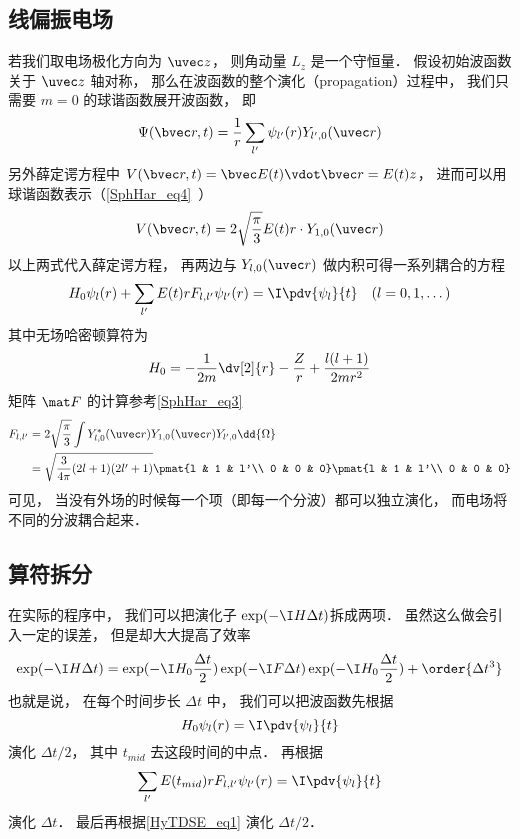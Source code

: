 \subsection{线偏振电场}
若我们取电场极化方向为 $\uvec z$， 则角动量 $L_z$ 是一个守恒量． 假设初始波函数关于 $\uvec z$ 轴对称， 那么在波函数的整个演化（propagation）过程中， 我们只需要 $m=0$ 的球谐函数展开波函数， 即
\begin{equation}
\Psi(\bvec r, t) = \frac{1}{r}\sum_{l'} \psi_{l'}(r) Y_{l', 0}(\uvec r)
\end{equation}
另外薛定谔方程中 $V(\bvec r, t) = \bvec E(t) \vdot \bvec r = E(t) z$， 进而可以用球谐函数表示（\autoref{SphHar_eq4}~）
\begin{equation}
V(\bvec r, t) = 2 \sqrt{\frac{\pi}{3}} E(t) r \cdot Y_{1,0}(\uvec r)
\end{equation}
以上两式代入薛定谔方程， 再两边与 $Y_{l,0}(\uvec r)$ 做内积可得一系列耦合的方程
\begin{equation}\label{HyTDSE_eq4}
H_0 \psi_{l}(r) + \sum_{l'} E(t)rF_{l, l'} \psi_{l'}(r) = \I \pdv{\psi_{l}}{t} \quad (l=0,1,\dots)
\end{equation}
其中无场哈密顿算符为
\begin{equation}
H_0 = -\frac{1}{2m} \dv[2]{r} -\frac{Z}{r} + \frac{l(l+1)}{2mr^2}
\end{equation}
矩阵 $\mat F$ 的计算参考\autoref{SphHar_eq3}~
\begin{equation}
\begin{aligned}
F_{l,l'} &= 2 \sqrt{\frac{\pi}{3}} \int Y_{l,0}^*(\uvec r) Y_{1,0}(\uvec r) Y_{l',0} \dd{\Omega}\\
&= \sqrt{\frac{3}{4\pi} (2l+1)(2l'+1)} \pmat{l & 1 & l'\\ 0 & 0 & 0}\pmat{l & 1 & l'\\ 0 & 0 & 0}
\end{aligned}
\end{equation}
可见， 当没有外场的时候每一个项（即每一个分波）都可以独立演化， 而电场将不同的分波耦合起来．

\subsection{算符拆分}
在实际的程序中， 我们可以把演化子 $\exp(-\I H \Delta t)$拆成两项． 虽然这么做会引入一定的误差， 但是却大大提高了效率
\begin{equation}\label{HyTDSE_eq2}
\exp(-\I H \Delta t) = \exp(-\I H_0 \frac{\Delta t}{2}) \exp(-\I F \Delta t)\exp(-\I H_0 \frac{\Delta t}{2}) + \order{\Delta t^3}
\end{equation}
也就是说， 在每个时间步长 $\Delta t$ 中， 我们可以把波函数先根据
\begin{equation}\label{HyTDSE_eq1}
H_0 \psi_{l}(r) = \I \pdv{\psi_{l}}{t}
\end{equation}
演化 $\Delta t/2$， 其中 $t_{mid}$ 去这段时间的中点． 再根据
\begin{equation}
\sum_{l'} E(t_{mid})rF_{l, l'} \psi_{l'}(r) = \I \pdv{\psi_{l}}{t}
\end{equation}
演化 $\Delta t$． 最后再根据\autoref{HyTDSE_eq1} 演化 $\Delta t/2$．

